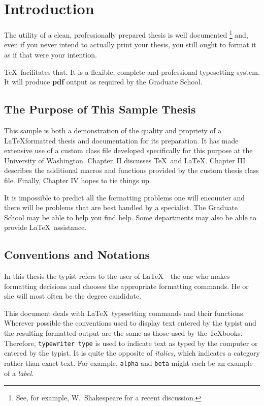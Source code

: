 \documentclass [11pt, proquest] {uwthesis}[2020/02/24]
\begin{document}
 
 
%
%

\textpages
 
 
\chapter {Introduction}
 
The utility of a clean, professionally prepared thesis is well
documented%
\footnote{See, for example,
  W.~Shakespeare\cite{Hamlet} for a recent discussion.}
and, even if you never intend to actually print your thesis,
you still ought to format it as if that were your intention.
 
\TeX\ facilitates that. It is a flexible,
complete and professional typesetting system.
It will produce {\bf pdf} output as required by the Graduate School.

\section{The Purpose of This Sample Thesis}
 
This sample is both a demonstration of the quality and
propriety of a \LaTeX formatted thesis and  
documentation for its preparation.
It has made extensive use of a custom class file
developed specifically for this purpose
at the University of Washington.  Chapter~II discusses
\TeX\ and \LaTeX.
Chapter III describes the additional macros and functions
provided by the custom thesis class file.  Finally, Chapter IV hopes to tie things up.
 
It is 
impossible to predict all the formatting problems one will encounter
and there will be problems that are best handled
by a specialist.  
The Graduate School may be able to help you find help.
Some departments may also be able to provide \LaTeX\ assistance.
 
 
\section{Conventions and Notations}
 
In this thesis the typist
refers to the user of \LaTeX---the one who
makes formatting decisions and chooses the appropriate
formatting commands.
He or she will most often be the degree candidate.
 
This document deals with \LaTeX\ typesetting commands and their
functions.  Wherever possible the conventions used to display
text entered by the typist and the resulting formatted output
are the same as those used by the \TeX books.
Therefore, {\tt typewriter type} is used to indicate text
as typed by the computer
or entered by the typist.
It is quite the opposite of {\it italics,} which indicates
a category rather than exact text.  For example,
{\tt alpha} and {\tt beta} might each be an example of a {\it label}.
 
\end{document}
